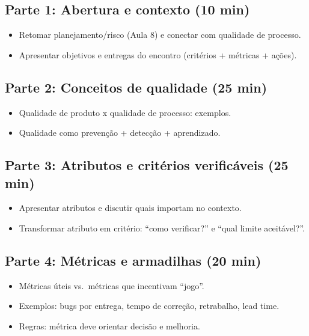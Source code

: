 \documentclass[12pt,a4paper]{article}
\begin{document}
\subsection*{Parte 1: Abertura e contexto (10 min)}
\begin{itemize}[leftmargin=*,itemsep=0.35em]
  \item Retomar planejamento/risco (Aula 8) e conectar com qualidade de processo.
  \item Apresentar objetivos e entregas do encontro (critérios + métricas + ações).
\end{itemize}

\subsection*{Parte 2: Conceitos de qualidade (25 min)}
\begin{itemize}[leftmargin=*,itemsep=0.35em]
  \item Qualidade de produto x qualidade de processo: exemplos.
  \item Qualidade como prevenção + detecção + aprendizado.
\end{itemize}

\subsection*{Parte 3: Atributos e critérios verificáveis (25 min)}
\begin{itemize}[leftmargin=*,itemsep=0.35em]
  \item Apresentar atributos e discutir quais importam no contexto.
  \item Transformar atributo em critério: ``como verificar?'' e ``qual limite aceitável?''.
\end{itemize}

\subsection*{Parte 4: Métricas e armadilhas (20 min)}
\begin{itemize}[leftmargin=*,itemsep=0.35em]
  \item Métricas úteis vs.\ métricas que incentivam ``jogo''.
  \item Exemplos: bugs por entrega, tempo de correção, retrabalho, lead time.
  \item Regras: métrica deve orientar decisão e melhoria.
\end{itemize}
\end{document}
